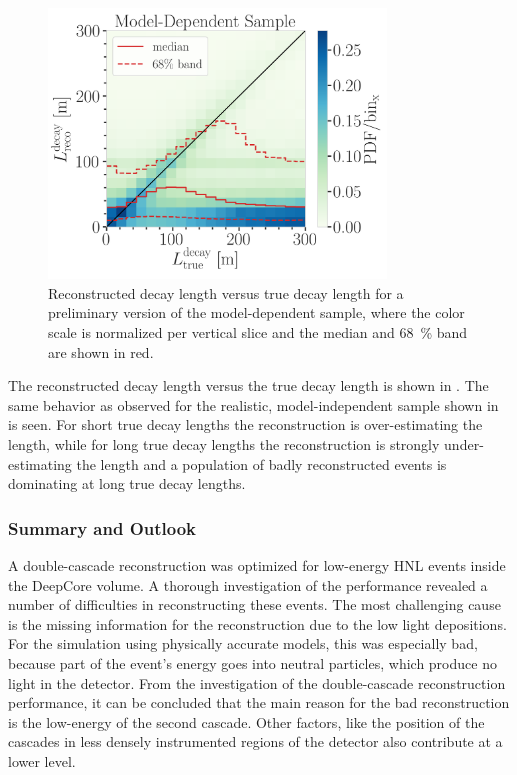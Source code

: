 \begin{figure}[h]
    \includegraphics[width=0.8\textwidth]{figures/results/190607/resolutions/reco_decayL_vs_true_decayL_final_level_good_step_contours.png}
    \caption[Reconstructed decay length resolution versus true decay length - preliminary model-dependent sample]{Reconstructed decay length versus true decay length for a preliminary version of the model-dependent sample, where the color scale is normalized per vertical slice and the median and \SI{68}{\percent} band are shown in red.}
\end{figure}
The reconstructed decay length versus the true decay length is shown in . The same behavior as observed for the realistic, model-independent sample shown in  is seen. For short true decay lengths the reconstruction is over-estimating the length, while for long true decay lengths the reconstruction is strongly under-estimating the length and a population of badly reconstructed events is dominating at long true decay lengths.


\subsubsection{Summary and Outlook}

A double-cascade reconstruction was optimized for low-energy HNL events inside the DeepCore volume. A thorough investigation of the performance revealed a number of difficulties in reconstructing these events. The most challenging cause is the missing information for the reconstruction due to the low light depositions. For the simulation using physically accurate models, this was especially bad, because part of the event's energy goes into neutral particles, which produce no light in the detector. From the investigation of the double-cascade reconstruction performance, it can be concluded that the main reason for the bad reconstruction is the low-energy of the second cascade. Other factors, like the position of the cascades in less densely instrumented regions of the detector also contribute at a lower level.

